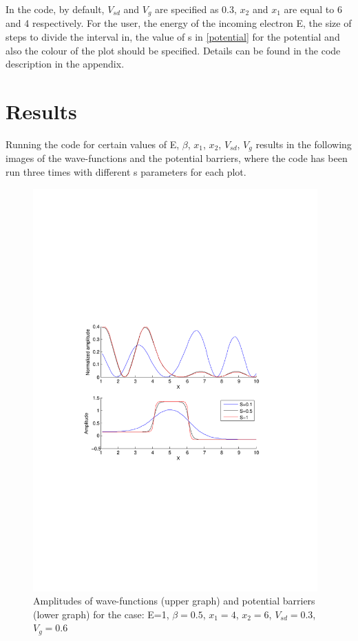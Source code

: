 \documentclass[a4paper]{article}
\begin{document}
In the code, by default, $V_{sd}$ and $V_g$ are specified as $0.3$, $x_2$ and $x_1$ are equal to 6 and 4 respectively.
For the user, the energy of the incoming electron E, the size of steps to divide the interval in, the value of s in \eqref{potential} for the potential and also the colour of the plot should be specified. Details can be found in the code description in the appendix.

\section{Results}
Running the code for certain values of E, $\beta$, $x_1$, $x_2$, $V_{sd}$, $V_g$ results in the following images of the wave-functions and the potential barriers, where the code has been run three times with different s parameters for each plot.
\begin{figure}[h!]
\centering
\includegraphics[width=4.3in]{test}
\caption{Amplitudes of wave-functions (upper graph) and potential barriers (lower graph) for the case: E=1, $\beta=0.5$, $x_1=4$, $x_2=6$, $V_{sd}=0.3$, $V_g=0.6$}
\label{fig:test}
\end{figure}
\newpage
\end{document}
